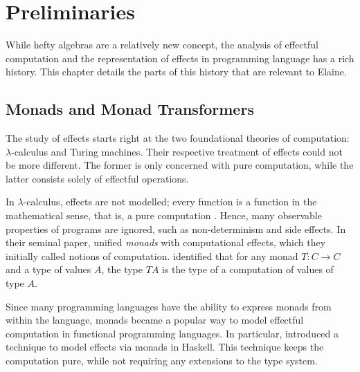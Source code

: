 \chapter{Preliminaries}\label{chap:preliminaries}

While hefty algebras are a relatively new concept, the analysis of effectful computation and the representation of effects in programming language has a rich history. This chapter details the parts of this history that are relevant to Elaine.

\section{Monads and Monad Transformers}

The study of effects starts right at the two foundational theories of computation: $\lambda$-calculus and Turing machines. Their respective treatment of effects could not be more different. The former is only concerned with pure computation, while the latter consists solely of effectful operations.

In $\lambda$-calculus, effects are not modelled; every function is a function in the mathematical sense, that is, a pure computation \autocite{moggi_computational_1989}. Hence, many observable properties of programs are ignored, such as non-determinism and side effects. In their seminal paper, \textcite{moggi_computational_1989} unified \emph{monads} with computational effects, which they initially called notions of computation. \citeauthor{moggi_computational_1989} identified that for any monad $T: C \to C$ and a type of values $A$, the type $T A$ is the type of a computation of values of type $A$.

Since many programming languages have the ability to express monads from within the language, monads became a popular way to model effectful computation in functional programming languages. In particular, \textcite{peyton_jones_imperative_1993} introduced a technique to model effects via monads in Haskell. This technique keeps the computation pure, while not requiring any extensions to the type system.



